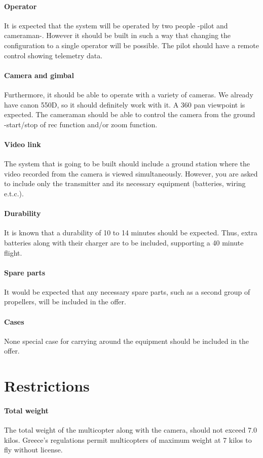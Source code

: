 \documentclass[a4paper, 12pt, twoside]{article}
\begin{document}
		\paragraph{Operator}{It is expected that the system will be operated by two people -pilot and cameraman-. However it should be built in such a way that changing the configuration to a single operator will be possible. The pilot should have a remote control showing telemetry data.
		}
		\paragraph{Camera and gimbal}{Furthermore, it should be able to operate with a variety of cameras. We already have canon 550D, so it should definitely work with it. A 360 pan viewpoint is expected. The cameraman should be able to control the camera from the ground -start/stop of rec function and/or zoom function.
		}
		\paragraph{Video link}{The system that is going to be built should include a ground station where the video recorded from the camera is viewed simultaneously. However, you are asked to include only the transmitter and its necessary equipment (batteries, wiring e.t.c.).
		}
		\paragraph{Durability}{It is known that a durability of 10 to 14 minutes should be expected. Thus, extra batteries along with their charger are to be included, supporting a 40 minute flight.
		}
		\paragraph{Spare parts}{It would be expected that any necessary spare parts, such as a second group of propellers, will be included in the offer.
		}
		\paragraph{Cases}{None special case for carrying around the equipment should be included in the offer.
		}
		
	
	\section{Restrictions}
		\paragraph{Total weight}{The total weight of the multicopter along with the camera, should not exceed 7.0 kilos. Greece's regulations permit multicopters of maximum weight at 7 kilos to fly without license.
		}
		
\end{document}
